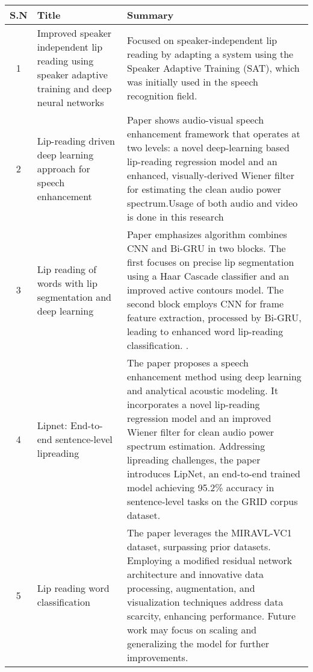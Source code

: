       
    \begin{flushleft}        
    \begin{longtable}{ |c|p{5cm}|p{7.5cm}| } 
        \hline
        \textbf{S.N} & \textbf{Title} & \textbf{Summary} \\ 
        \hline
        1 & Improved speaker independent lip reading using speaker adaptive training and deep neural networks \cite{almajai2016improved} & Focused on speaker-independent lip reading by adapting a system using the Speaker Adaptive Training (SAT), which was initially used in the speech recognition field. \\
        
        \hline
        2 & Lip-reading driven deep learning approach for speech enhancement \cite{adeel2019lip} &Paper shows audio-visual speech enhancement framework that operates at two levels: a novel deep-learning based lip-reading regression model and an enhanced, visually-derived Wiener filter for estimating the clean audio power spectrum.Usage of both audio and video is done in this research \\
        \hline
        3 & Lip reading of words with lip segmentation and deep learning \cite{miled2023lip} & Paper emphasizes algorithm combines CNN and Bi-GRU in two blocks. The first focuses on precise lip segmentation using a Haar Cascade classifier and an improved active contours model. The second block employs CNN for frame feature extraction, processed by Bi-GRU, leading to enhanced word lip-reading classification.  .\\
        \hline
        4 & Lipnet: End-to-end sentence-level lipreading \cite{assael2016lipnet} & The paper proposes a speech enhancement method using deep learning and analytical acoustic modeling. It incorporates a novel lip-reading regression model and an improved Wiener filter for clean audio power spectrum estimation. Addressing lipreading challenges, the paper introduces LipNet, an end-to-end trained model achieving 95.2\% accuracy in sentence-level tasks on the GRID corpus dataset.\\
        \hline
        5 & Lip reading word classification \cite{gutierrez2017lip} & The paper leverages the MIRAVL-VC1 dataset, surpassing prior datasets. Employing a modified residual network architecture and innovative data processing, augmentation, and visualization techniques address data scarcity, enhancing performance. Future work may focus on scaling and generalizing the model for further improvements.\\
        \hline

\end{longtable}
\end{flushleft}
